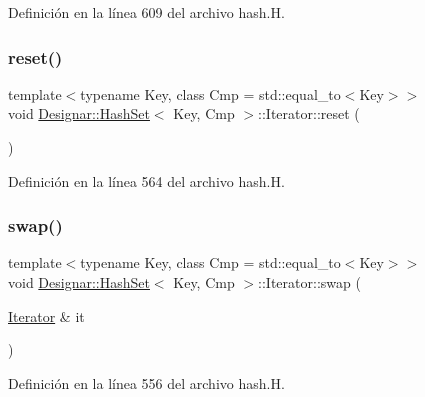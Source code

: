 Definición en la línea 609 del archivo hash.\+H.

\mbox{\label{class_designar_1_1_hash_set_1_1_iterator_a4563f0da2eaf8dc2b4879cc959f7c277}} 
\subsubsection{\texorpdfstring{reset()}{reset()}}
{\footnotesize\ttfamily template$<$typename Key, class Cmp = std\+::equal\+\_\+to$<$\+Key$>$$>$ \\
void \hyperlink{class_designar_1_1_hash_set}{Designar\+::\+Hash\+Set}$<$ Key, Cmp $>$\+::Iterator\+::reset (\begin{DoxyParamCaption}{ }\end{DoxyParamCaption})\hspace{0.3cm}{\ttfamily [inline]}}



Definición en la línea 564 del archivo hash.\+H.

\mbox{\label{class_designar_1_1_hash_set_1_1_iterator_a5849b111320c33206baef1926cb3f156}} 
\subsubsection{\texorpdfstring{swap()}{swap()}}
{\footnotesize\ttfamily template$<$typename Key, class Cmp = std\+::equal\+\_\+to$<$\+Key$>$$>$ \\
void \hyperlink{class_designar_1_1_hash_set}{Designar\+::\+Hash\+Set}$<$ Key, Cmp $>$\+::Iterator\+::swap (\begin{DoxyParamCaption}\item[{\hyperlink{class_designar_1_1_hash_set_1_1_iterator}{Iterator} \&}]{it }\end{DoxyParamCaption})\hspace{0.3cm}{\ttfamily [inline]}}



Definición en la línea 556 del archivo hash.\+H.



